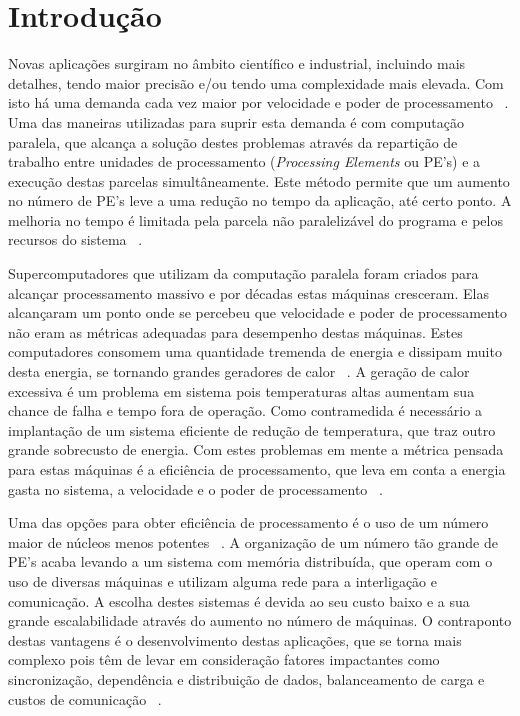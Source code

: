 \documentclass[
	12pt,				%
	openright,			%
	twoside,			%
	a4paper,			%
	english,			%
	brazil,				%
	]{abntex2}
\begin{document}
\section{Introdução}
\label{sec:introducao}

Novas aplicações surgiram no âmbito científico e industrial, incluindo mais detalhes, tendo maior precisão e/ou tendo uma complexidade mais elevada. Com isto há uma demanda cada vez maior por velocidade e poder de processamento ~\cite{pilla-thesis}. Uma das maneiras utilizadas para suprir esta demanda é com computação paralela, que alcança a solução destes problemas através da repartição de trabalho entre unidades de processamento (\textit{Processing Elements} ou PE's) e a execução destas parcelas simultâneamente. Este método permite que um aumento no número de PE’s leve a uma redução no tempo da aplicação, até certo ponto. A melhoria no tempo é limitada pela parcela não paralelizável do programa e pelos recursos do sistema ~\cite{gustafson}. 

Supercomputadores que utilizam da computação paralela foram criados para alcançar processamento massivo e por décadas estas máquinas cresceram. Elas alcançaram um ponto onde se percebeu que velocidade e poder de processamento não eram as métricas adequadas para desempenho destas máquinas. Estes computadores consomem uma quantidade tremenda de energia e dissipam muito desta energia, se tornando grandes geradores de calor ~\cite{green500}. A geração de calor excessiva é um problema em sistema pois temperaturas altas aumentam sua chance de falha e tempo fora de operação. Como contramedida é necessário a implantação de um sistema eficiente de redução de temperatura, que traz outro grande sobrecusto de energia. Com estes problemas em mente a métrica pensada para estas máquinas é a eficiência de processamento, que leva em conta a energia gasta no sistema, a velocidade e o poder de processamento ~\cite{efficient-metric}.

Uma das opções para obter eficiência de processamento é o uso de um número maior de núcleos menos potentes ~\cite{snir-encyclopedia}. A organização de um número tão grande de PE’s acaba levando a um sistema com memória distribuída, que operam com o uso de diversas máquinas e utilizam alguma rede para a interligação e comunicação. A escolha destes sistemas é devida ao seu custo baixo e a sua grande escalabilidade através do aumento no número de máquinas. O contraponto destas vantagens é o desenvolvimento destas aplicações, que se torna mais complexo pois têm de levar em consideração fatores impactantes como sincronização, dependência e distribuição de dados, balanceamento de carga e custos de comunicação ~\cite{pilla-thesis}.
\end{document}
